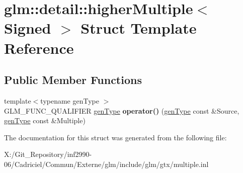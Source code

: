 \hypertarget{structglm_1_1detail_1_1higher_multiple}{\section{glm\-:\-:detail\-:\-:higher\-Multiple$<$ Signed $>$ Struct Template Reference}
\label{structglm_1_1detail_1_1higher_multiple}
}
\subsection*{Public Member Functions}
\begin{DoxyCompactItemize}
\item 
\hypertarget{structglm_1_1detail_1_1higher_multiple_a6361633200080a366cd84e43b30d70bb}{{\footnotesize template$<$typename gen\-Type $>$ }\\G\-L\-M\-\_\-\-F\-U\-N\-C\-\_\-\-Q\-U\-A\-L\-I\-F\-I\-E\-R \hyperlink{structglm_1_1detail_1_1gen_type}{gen\-Type} {\bfseries operator()} (\hyperlink{structglm_1_1detail_1_1gen_type}{gen\-Type} const \&Source, \hyperlink{structglm_1_1detail_1_1gen_type}{gen\-Type} const \&Multiple)}\label{structglm_1_1detail_1_1higher_multiple_a6361633200080a366cd84e43b30d70bb}

\end{DoxyCompactItemize}


The documentation for this struct was generated from the following file\-:\begin{DoxyCompactItemize}
\item 
X\-:/\-Git\-\_\-\-Repository/inf2990-\/06/\-Cadriciel/\-Commun/\-Externe/glm/include/glm/gtx/multiple.\-inl\end{DoxyCompactItemize}
